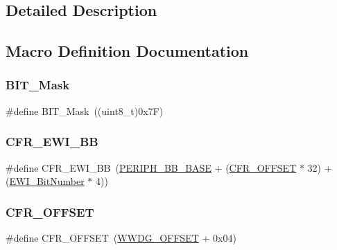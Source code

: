 \subsection{Detailed Description}


\subsection{Macro Definition Documentation}
\mbox{\label{group___w_w_d_g___private___defines_ga01a4e07e98e933af78671f65a49bd836}} 
\subsubsection{\texorpdfstring{BIT\_Mask}{BIT\_Mask}}
{\footnotesize\ttfamily \#define B\+I\+T\+\_\+\+Mask~((uint8\+\_\+t)0x7\+F)}

\mbox{\label{group___w_w_d_g___private___defines_gaa48804210cea547f0e0f4ca49c44fc94}} 
\subsubsection{\texorpdfstring{CFR\_EWI\_BB}{CFR\_EWI\_BB}}
{\footnotesize\ttfamily \#define C\+F\+R\+\_\+\+E\+W\+I\+\_\+\+BB~(\mbox{\hyperlink{group___peripheral__memory__map_gaed7efc100877000845c236ccdc9e144a}{P\+E\+R\+I\+P\+H\+\_\+\+B\+B\+\_\+\+B\+A\+SE}} + (\mbox{\hyperlink{group___w_w_d_g___private___defines_ga3e0f9d9f7f69a6d133bba721e25aca4a}{C\+F\+R\+\_\+\+O\+F\+F\+S\+ET}} $\ast$ 32) + (\mbox{\hyperlink{group___w_w_d_g___private___defines_ga97c9005823520f5aaefe211923b48215}{E\+W\+I\+\_\+\+Bit\+Number}} $\ast$ 4))}

\mbox{\label{group___w_w_d_g___private___defines_ga3e0f9d9f7f69a6d133bba721e25aca4a}} 
\subsubsection{\texorpdfstring{CFR\_OFFSET}{CFR\_OFFSET}}
{\footnotesize\ttfamily \#define C\+F\+R\+\_\+\+O\+F\+F\+S\+ET~(\mbox{\hyperlink{group___w_w_d_g___private___defines_gab6dcdf2385dd7317ec775e146cff40ca}{W\+W\+D\+G\+\_\+\+O\+F\+F\+S\+ET}} + 0x04)}

